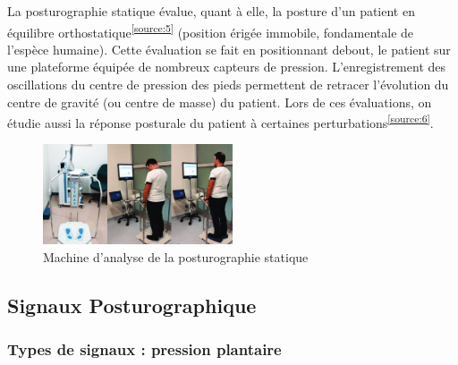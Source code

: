 La posturographie statique évalue, quant à elle, la posture d’un patient en équilibre orthostatique\textsuperscript{\ref{source:5}} (position érigée immobile, fondamentale de l'espèce humaine). 
Cette évaluation se fait en positionnant debout, le patient sur une plateforme équipée de nombreux capteurs de pression. 
L’enregistrement des oscillations du centre de pression des pieds permettent de retracer l'évolution du centre de gravité (ou centre de masse) du patient. 
Lors de ces évaluations, on étudie aussi la réponse posturale du patient à certaines perturbations\textsuperscript{\ref{source:6}}.

\begin{figure}[H]                                                                                                                                                                                                             
  \centering
  \includegraphics[width=0.5\textwidth]{images/introduction/statique.png}
  \caption{Machine d’analyse de la posturographie statique }
  \label{fig:posturographie-statique}
\end{figure}

\subsection{Signaux Posturographique}

\subsubsection{Types de signaux : pression plantaire}

